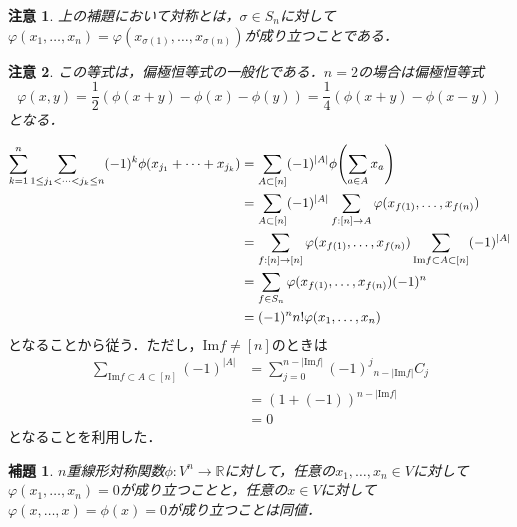 \documentclass{ltjsarticle}
\makeatletter
\theoremstyle{mystyle1}
\newtheorem{lem}[dfn]{補題}
\theoremstyle{mystyle2}
\newtheorem{note*}{注意}
\theoremstyle{mystyle3}
\renewenvironment{proof}[1][\proofname]{\par
  \pushQED{\qed}%
  \normalfont
  \topsep6\p@\@plus6\p@ \trivlist
  \item[\hskip\labelsep{\bfseries\sffamily #1}]\ignorespaces
}{%
  \popQED\endtrivlist\@endpefalse
}
\renewcommand\proofname{証明}
\makeatother
\begin{document}
\begin{note*}
    上の補題において対称とは，$\sigma\in S_n$に対して$\varphi(x_1,\ldots,x_n)=\varphi(x_{\sigma(1)},\ldots,x_{\sigma(n)})$が成り立つことである．
\end{note*}

\begin{note*}
    この等式は，偏極恒等式の一般化である．$n=2$の場合は偏極恒等式
    \begin{equation}
        \varphi(x,y)=\frac{1}{2}(\phi(x+y)-\phi(x)-\phi(y))=\frac{1}{4}(\phi(x+y)-\phi(x-y))
    \end{equation}
    となる．
\end{note*}

\begin{proof}
    \begin{equation}
        \begin{split}
            \sum_{k=1}^n\sum_{1\leq j_1<\cdots<j_k\leq n}(-1)^k\phi(x_{j_1}+\cdots+x_{j_k})
            & =\sum_{A\subset[n]}(-1)^{|A|}\phi\mleft(\sum_{a\in A}x_a\mright)                                      \\
            & =\sum_{A\subset [n]}(-1)^{|A|}\sum_{f:[n]\to A}\varphi(x_{f(1)},\ldots,x_{f(n)})                      \\
            & =\sum_{f:[n]\to[n]}\varphi(x_{f(1)},\ldots,x_{f(n)})\sum_{\mathrm{Im}f\subset A\subset [n]}(-1)^{|A|} \\
            & =\sum_{f\in S_n}\varphi(x_{f(1)},\ldots,x_{f(n)})(-1)^n                                               \\
            & =(-1)^nn!\varphi(x_1,\ldots,x_n)
        \end{split}
    \end{equation}
    となることから従う．ただし，$\mathrm{Im}f\neq [n]$のときは
    \begin{equation}
        \begin{split}
            \sum_{\mathrm{Im}f\subset A\subset [n]}(-1)^{|A|}
            & =\sum_{j=0}^{n-|\mathrm{Im}f|}(-1)^j{}_{n-|\mathrm{Im}f|}C_j \\
            & =(1+(-1))^{n-|\mathrm{Im}f|}                                 \\
            & =0
        \end{split}
    \end{equation}
    となることを利用した．
\end{proof}

\begin{lem}
    $n$重線形対称関数$\phi:V^n\to\mathbb{R}$に対して，任意の$x_1,\ldots,x_n\in V$に対して$\varphi(x_1,\ldots,x_n)=0$が成り立つことと，任意の$x\in V$に対して$\varphi(x,\ldots,x)=\phi(x)=0$が成り立つことは同値．
\end{lem}
\end{document}
